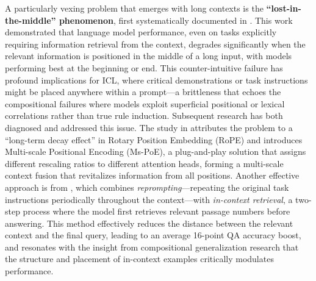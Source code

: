 \documentclass[11pt]{article}
\begin{document}
A particularly vexing problem that emerges with long contexts is the \textbf{``lost-in-the-middle'' phenomenon}, first systematically documented in \cite{ref630}. This work demonstrated that language model performance, even on tasks explicitly requiring information retrieval from the context, degrades significantly when the relevant information is positioned in the middle of a long input, with models performing best at the beginning or end. This counter-intuitive failure has profound implications for ICL, where critical demonstrations or task instructions might be placed anywhere within a prompt---a brittleness that echoes the compositional failures where models exploit superficial positional or lexical correlations rather than true rule induction. Subsequent research has both diagnosed and addressed this issue. The study in \cite{ref631} attributes the problem to a ``long-term decay effect'' in Rotary Position Embedding (RoPE) and introduces Multi-scale Positional Encoding (Ms-PoE), a plug-and-play solution that assigns different rescaling ratios to different attention heads, forming a multi-scale context fusion that revitalizes information from all positions. Another effective approach is \cite{ref632} from \cite{ref633}, which combines \emph{reprompting}---repeating the original task instructions periodically throughout the context---with \emph{in-context retrieval}, a two-step process where the model first retrieves relevant passage numbers before answering. This method effectively reduces the distance between the relevant context and the final query, leading to an average 16-point QA accuracy boost, and resonates with the insight from compositional generalization research that the structure and placement of in-context examples critically modulates performance.
\end{document}
